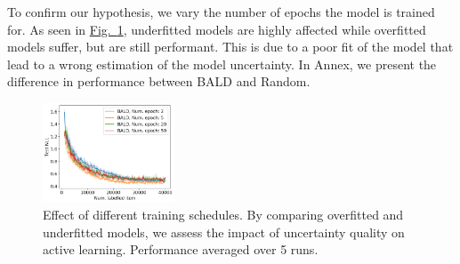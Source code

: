 \documentclass{article}
\newcommand{\figref}[1]{\hyperref[#1]{Fig.\ \ref*{#1}}}
\newcommand{\tabref}[1]{\hyperref[#1]{Table\ \ref*{#1}}}
\begin{document}
To confirm our hypothesis, we vary the number of epochs the model is trained for. As seen in \figref{fig:convergence}, underfitted models are highly affected while overfitted models suffer, but are still performant. This is due to a poor fit of the model that lead to a wrong estimation of the model uncertainty. %
In Annex, we present the difference in performance between BALD and Random.

\begin{figure}
    \centering
    \includegraphics[width=0.35\textwidth]{fig/lrn_epoch.png}
    \caption{Effect of different training schedules. By comparing overfitted and underfitted models, we assess the impact of uncertainty quality on active learning. Performance averaged over 5 runs.}
    \label{fig:convergence}
\end{figure}




\end{document}
